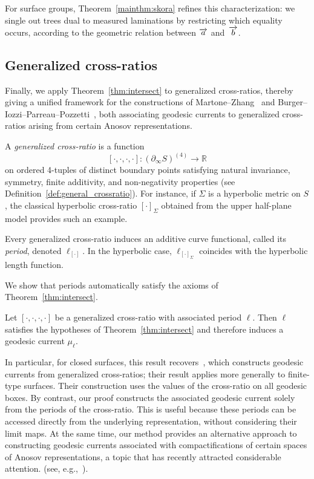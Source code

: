 For surface groups, Theorem~\ref{mainthm:skora} refines this
characterization: we single out trees dual to measured laminations
by restricting which equality occurs, according to the geometric
relation between $\overrightarrow{a}$ and~$\overrightarrow{b}$.

\subsection{Generalized cross-ratios}

Finally, we apply Theorem~\ref{thm:intersect} to generalized
cross-ratios, thereby giving a unified framework for
the constructions of
Martone--Zhang~\cite{MZ19:PositivelyRatioed} and
Burger--Iozzi--Parreau--Pozzetti~\cite{BIPP24:PositiveCrossratios},
both associating geodesic currents to generalized cross-ratios arising
from certain Anosov representations.

A \emph{generalized cross-ratio} is a function
\[
[\cdot,\cdot,\cdot,\cdot]\colon (\partial_\infty S)^{(4)}\to\mathbb{R}
\]
on ordered 4-tuples of distinct boundary points satisfying natural
invariance, symmetry, finite additivity, and non-negativity properties
(see Definition~\ref{def:general_crossratio}). 
For instance, if $\Sigma$ is a hyperbolic metric on $S$, the classical
hyperbolic cross-ratio $[\cdot]_\Sigma$ obtained from the upper
half-plane model provides such an example.

Every generalized cross-ratio induces an additive curve functional,
called its \emph{period}, denoted $\ell_{[\cdot]}$.
In the hyperbolic case, $\ell_{[\cdot]_\Sigma}$ coincides with the
hyperbolic length function.

We show that periods automatically satisfy the
axioms of Theorem~\ref{thm:intersect}.
\begin{mainthm}
Let $[\cdot,\cdot,\cdot,\cdot]$ be a generalized cross-ratio with
associated period $\ell$. Then $\ell$ satisfies the hypotheses of
Theorem~\ref{thm:intersect} and therefore induces a geodesic current
$\mu_\ell$.
\label{mainthm:crossratio}
\end{mainthm}
  
In particular, for closed surfaces, this result
recovers~\cite[Proposition~4.8]{BIPP24:PositiveCrossratios}, which
constructs geodesic currents from generalized cross-ratios; their
result applies more generally to finite-type surfaces. Their
construction uses the values of the cross-ratio on all geodesic boxes.
By contrast, our proof constructs the associated geodesic current solely
from the periods of the cross-ratio. This is useful because these
periods can be accessed directly from the underlying
representation, without considering their limit maps. At the same time, our method provides an alternative
approach to constructing geodesic currents associated with
compactifications of certain spaces of Anosov representations, a topic
that has recently attracted considerable attention.
 (see,
e.g.,~\cite{OT23:SO23,OT24:Blaschke,Reid25:Boundary,PS26:1ntranslation}).

